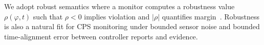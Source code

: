 \documentclass[letterpaper,twocolumn,10pt]{article}
\newcommand{\SafetyIsland}{safety island\xspace}
\newcommand{\STL}{STL\xspace}
\newcommand{\FTTI}{FTTI\xspace}
\begin{document}
We adopt robust semantics where a monitor computes a robustness value $\rho(\varphi, t)$ such that $\rho<0$ implies violation and $|\rho|$ quantifies margin~\cite{FainekosPappas2009,Deshmukh2017}. Robustness is also a natural fit for CPS monitoring under bounded sensor noise and bounded time-alignment error between controller reports and evidence.





\end{document}
